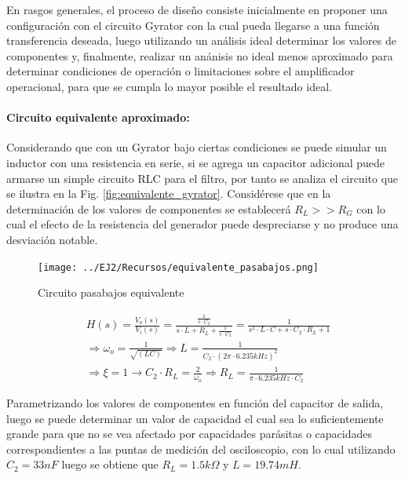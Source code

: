 En rasgos generales, el proceso de dise\~no consiste inicialmente en proponer una configuraci\'on con el circuito Gyrator con la cual pueda llegarse a una funci\'on transferencia deseada,
luego utilizando un an\'alisis ideal determinar los valores de componentes y, finalmente, realizar un an\'anisis no ideal menos aproximado para determinar condiciones de operaci\'on o limitaciones sobre
el amplificador operacional, para que se cumpla lo mayor posible el resultado ideal.

\paragraph*{Circuito equivalente aproximado:} Considerando que con un Gyrator bajo ciertas condiciones se puede simular un inductor con una resistencia en serie, si se agrega un capacitor adicional puede armarse un simple circuito RLC para el filtro,
por tanto se analiza el circuito que se ilustra en la Fig. \ref{fig:equivalente_gyrator}. Consid\'erese que en la determinaci\'on de los valores de componentes se establecer\'a $R_L >> R_G$ con lo cual el efecto de 
la resistencia del generador puede despreciarse y no produce una desviaci\'on notable. 

\begin{figure}[H]
    \centering
    \texttt{[image: ../EJ2/Recursos/equivalente\_pasabajos.png]}
    \caption{Circuito pasabajos equivalente}
    \label{fig:equivalente_pasabajos}
\end{figure}

\begin{eqnarray*}
    & H(s) = \frac{V_o(s)}{V_i(s)} = \frac{ \frac{1}{s \cdot C_2} }{ s \cdot L + R_L + \frac{1}{s \cdot C_2}} = \frac{1}{s^{2} \cdot L \cdot C + s \cdot C_2 \cdot R_L + 1} \\
    & \Rightarrow \omega_o = \frac{1}{\sqrt{(LC)}} \Rightarrow L = \frac{1}{C_2 \cdot (2\pi \cdot 6.235kHz)^{2}} \\
    & \Rightarrow \xi = 1 \rightarrow C_2 \cdot R_L = \frac{2}{\omega_o} \Rightarrow R_L = \frac{1}{\pi \cdot 6.235kHz \cdot C_2}
\end{eqnarray*}

Parametrizando los valores de componentes en funci\'on del capacitor de salida, luego se puede determinar un valor de capacidad el cual sea lo suficientemente grande para que no se vea afectado
por capacidades par\'asitas o capacidades correspondientes a las puntas de medici\'on del osciloscopio, con lo cual utilizando $C_2 = 33nF$ luego se obtiene que $R_L = 1.5k \Omega$ y $L = 19.74mH$.

